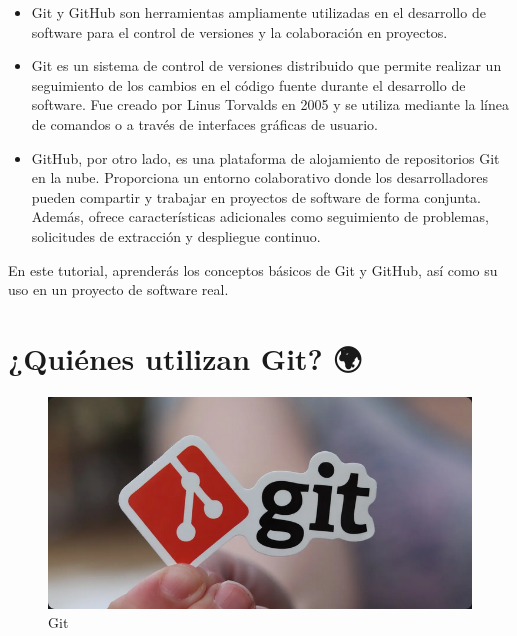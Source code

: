 \documentclass[
  a4paper,
  DIV=11,
  numbers=noendperiod,
  onepage,
  openany]{scrreprt}
\begin{document}
\begin{itemize}
\item
  Git y GitHub son herramientas ampliamente utilizadas en el desarrollo
  de software para el control de versiones y la colaboración en
  proyectos.
\item
  Git es un sistema de control de versiones distribuido que permite
  realizar un seguimiento de los cambios en el código fuente durante el
  desarrollo de software. Fue creado por Linus Torvalds en 2005 y se
  utiliza mediante la línea de comandos o a través de interfaces
  gráficas de usuario.
\item
  GitHub, por otro lado, es una plataforma de alojamiento de
  repositorios Git en la nube. Proporciona un entorno colaborativo donde
  los desarrolladores pueden compartir y trabajar en proyectos de
  software de forma conjunta. Además, ofrece características adicionales
  como seguimiento de problemas, solicitudes de extracción y despliegue
  continuo.
\end{itemize}

En este tutorial, aprenderás los conceptos básicos de Git y GitHub, así
como su uso en un proyecto de software real.

\section{¿Quiénes utilizan Git? 🌍}\label{quiuxe9nes-utilizan-git}

\begin{figure}[H]

{\centering \includegraphics[width=6.25in,height=\textheight,keepaspectratio]{unidades/unidad0/../../images/git-logo-sticker.png}

}

\caption{Git}

\end{figure}%
\end{document}
